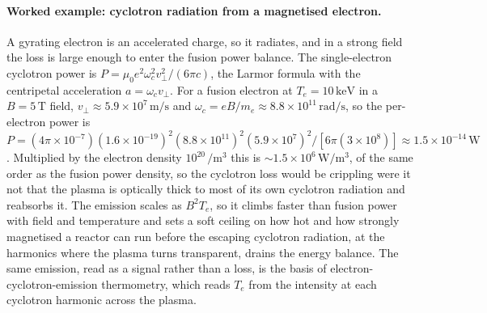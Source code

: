 \paragraph{Worked example: cyclotron radiation from a magnetised electron.}
A gyrating electron is an accelerated charge, so it radiates, and in a strong
field the loss is large enough to enter the fusion power balance. The
single-electron cyclotron power is $P = \mu_0 e^{2}\omega_c^{2}v_\perp^{2}/(6\pi
c)$, the Larmor formula with the centripetal acceleration $a = \omega_c
v_\perp$. For a fusion electron at $T_e = 10\,\si{\kilo\electronvolt}$ in a
$B = 5\,\si{\tesla}$ field, $v_\perp \approx 5.9\times 10^{7}\,\si{\meter\per
\second}$ and $\omega_c = eB/m_e \approx 8.8\times 10^{11}\,\si{\radian\per
\second}$, so the per-electron power is $P = (4\pi\times 10^{-7})(1.6\times
10^{-19})^{2}(8.8\times 10^{11})^{2}(5.9\times 10^{7})^{2}/[6\pi(3\times
10^{8})] \approx 1.5\times 10^{-14}\,\si{\watt}$. Multiplied by the electron
density $10^{20}\,\si{\per\meter\cubed}$ this is $\sim 1.5\times 10^{6}\,\si{\watt
\per\meter\cubed}$, of the same order as the fusion power density, so the
cyclotron loss would be crippling were it not that the plasma is optically thick
to most of its own cyclotron radiation and reabsorbs it. The emission scales as
$B^{2}T_e$, so it climbs faster than fusion power with field and temperature and
sets a soft ceiling on how hot and how strongly magnetised a reactor can run
before the escaping cyclotron radiation, at the harmonics where the plasma turns
transparent, drains the energy balance. The same emission, read as a signal
rather than a loss, is the basis of electron-cyclotron-emission thermometry,
which reads $T_e$ from the intensity at each cyclotron harmonic across the
plasma.

